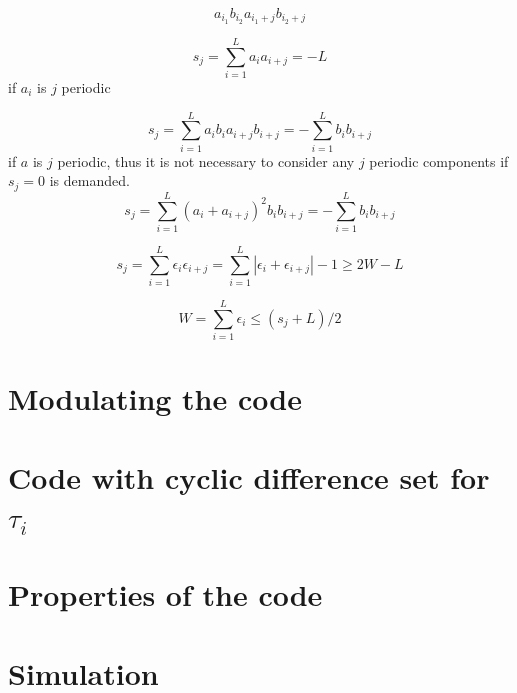 \documentclass[18pt,a4paper]{extarticle}
\begin{document}
\begin{equation}
a_{i_1}b_{i_2}a_{i_1+j}b_{i_2+j}
\end{equation}

\begin{equation}
s_j = \sum_{i=1}^{L} a_i a_{i+j} = -L
\end{equation}
if $a_i$ is $j$ periodic


\begin{equation}
s_j = \sum_{i=1}^{L} a_ib_i a_{i+j} b_{i+j} = - \sum_{i=1}^{L} b_i b_{i+j}
\end{equation}
if $a$ is $j$ periodic, thus it is not necessary to consider any $j$ periodic components if $s_j=0$ is demanded.
\begin{equation}
s_j = \sum_{i=1}^{L} (a_i + a_{i+j})^2 b_i  b_{i+j} = - \sum_{i=1}^{L} b_i b_{i+j}
\end{equation}

\begin{equation}
s_j = \sum_{i=1}^{L} \epsilon_i \epsilon_{i+j} = \sum_{i=1}^{L} |\epsilon_i + \epsilon_{i+j}| - 1 \geq 2 W - L
\end{equation}

\begin{equation}
W = \sum_{i=1}^{L} \epsilon_i \leq (s_j + L)/2
\end{equation}

\section{Modulating the code}

\section{Code with cyclic difference set for $\tau_i$}

\section{Properties of the code}



\section{Simulation}
\end{document}
